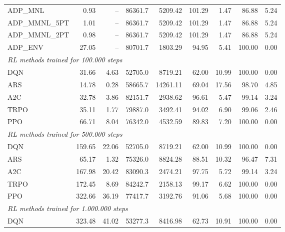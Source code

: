 \begin{samepage}
\begin{center}
\begin{tabular}{l|rr|rr|rr|rr}
    ADP\_MNL     &     0.93 &    -- &    86361.7 &    5209.42 &  101.29 &    1.47 &   86.88 &    5.24 \\
    ADP\_MMNL\_5PT &     1.01 &    -- &    86361.7 &    5209.42 &  101.29 &    1.47 &   86.88 &    5.24 \\
    ADP\_MMNL\_2PT &     0.98 &    -- &    86361.7 &    5209.42 &  101.29 &    1.47 &   86.88 &    5.24 \\
    ADP\_ENV     &    27.05 &    -- &    80701.7 &    1803.29 &   94.95 &    5.41 &  100.00 &    0.00 \\
    \midrule
    \multicolumn{9}{l}{\textit{RL methods trained for 100.000 steps}} \\
    \midrule
    DQN          &    31.66 &     4.63 &    52705.0 &    8719.21 &   62.00 &   10.99 &  100.00 &    0.00 \\
    ARS          &    14.78 &     0.28 &    58665.7 &   14261.11 &   69.04 &   17.56 &   98.70 &    4.85 \\
    A2C          &    32.78 &     3.86 &    82151.7 &    2938.62 &   96.61 &    5.47 &   99.14 &    3.24 \\
    TRPO         &    35.11 &     1.77 &    79887.0 &    3492.41 &   94.02 &    6.90 &   99.06 &    2.46 \\
    PPO          &    66.71 &     8.04 &    76342.0 &    4532.59 &   89.83 &    7.20 &  100.00 &    0.00 \\
    \midrule
    \multicolumn{9}{l}{\textit{RL methods trained for 500.000 steps}} \\
    \midrule
    DQN          &   159.65 &    22.06 &    52705.0 &    8719.21 &   62.00 &   10.99 &  100.00 &    0.00 \\
    ARS          &    65.17 &     1.32 &    75326.0 &    8824.28 &   88.51 &   10.32 &   96.47 &    7.31 \\
    A2C          &   167.98 &    20.42 &    83090.3 &    2474.21 &   97.75 &    5.72 &   99.14 &    3.24 \\
    TRPO         &   172.45 &     8.69 &    84242.7 &    2158.13 &   99.17 &    6.62 &  100.00 &    0.00 \\
    PPO          &   322.66 &    36.19 &    77417.7 &    3192.76 &   91.06 &    5.68 &  100.00 &    0.00 \\
    \midrule
    \multicolumn{9}{l}{\textit{RL methods trained for 1.000.000 steps}} \\
    \midrule
    DQN          &   323.48 &    41.02 &    53277.3 &    8416.98 &   62.73 &   10.91 &  100.00 &    0.00 \\

\end{tabular}
\end{center}
\end{samepage}
